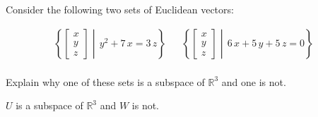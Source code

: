 
\begin{exerciseStatement}


Consider the following two sets of Euclidean vectors: 


\begin{align*}  \left\{ \left[\begin{array}{c}
x \\
y \\
z
\end{array}\right] \middle|\,y^{2} + 7 \, x = 3 \, z\right\}  & &   \left\{ \left[\begin{array}{c}
x \\
y \\
z
\end{array}\right] \middle|\,6 \, x + 5 \, y + 5 \, z = 0\right\}  \\ \end{align*}
            

 Explain why one of these sets is a subspace of \(\mathbb{R}^ 3 \) and one is not. 


\end{exerciseStatement}
    
\begin{exerciseAnswer} 


\(U\) is a subspace of \(\mathbb{R}^ 3 \) and \(W\) is not.


\end{exerciseAnswer}
    
